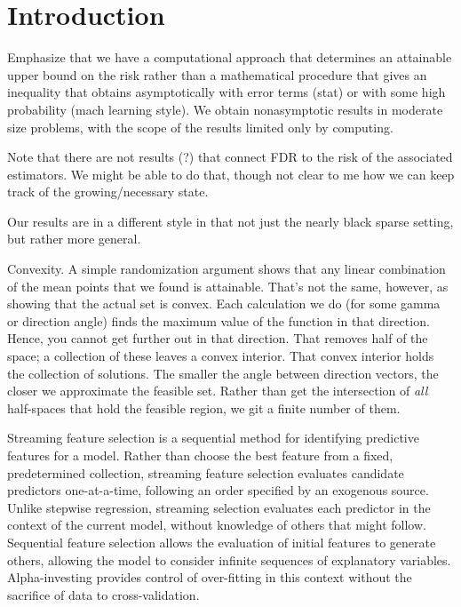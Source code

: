 \documentclass[12pt]{article}
\begin{document}
\clearpage



\section{Introduction}


 Emphasize that we have a computational approach that determines an attainable
 upper bound on the risk rather than a mathematical procedure that gives an
 inequality that obtains asymptotically with error terms (stat) or with some
 high probability (mach learning style).  We obtain nonasymptotic results in
 moderate size problems, with the scope of the results limited only by
 computing.


 Note that there are not results (?) that connect FDR to the risk of the
 associated estimators.  We might be able to do that, though not clear to me how
 we can keep track of the growing/necessary state.

 
 Our results are in a different style in that not just the nearly black sparse
 setting, but rather more general.

 
 Convexity. A simple randomization argument shows that any linear combination of
 the mean points that we found is attainable.  That's not the same, however, as
 showing that the actual set is convex.  Each calculation we do (for some gamma
 or direction angle) finds the maximum value of the function in that direction.
  Hence, you cannot get further out in that direction. That removes half of the
 space; a collection of these leaves a convex interior.  That convex interior
 holds the collection of solutions.  The smaller the angle between direction
 vectors, the closer we approximate the feasible set.  Rather than get the
 intersection of {\em all} half-spaces that hold the feasible region, we git a
 finite number of them.




 Streaming feature selection is a sequential method for identifying predictive
 features for a model.  Rather than choose the best feature from a fixed,
 predetermined collection, streaming feature selection evaluates candidate
 predictors one-at-a-time, following an order specified by an exogenous source.
  Unlike stepwise regression, streaming selection evaluates each predictor in
 the context of the current model, without knowledge of others that might
 follow.  Sequential feature selection allows the evaluation of initial features
 to generate others, allowing the model to consider infinite sequences of
 explanatory variables. Alpha-investing provides control of over-fitting in this
 context without the sacrifice of data to cross-validation.
\end{document}
